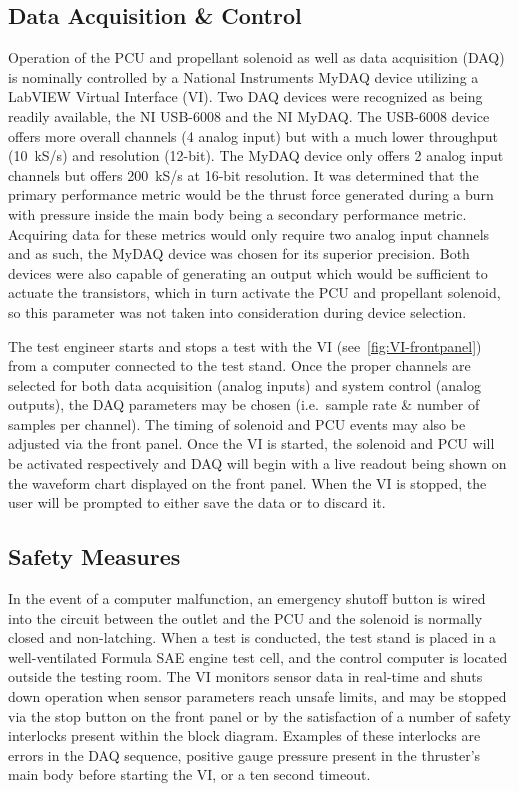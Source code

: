 \documentclass[journal]{IEEEtran}
\begin{document}
\subsection{Data Acquisition \& Control}

Operation of the PCU and propellant solenoid as well as data acquisition (DAQ) is nominally controlled by a National Instruments MyDAQ device utilizing a LabVIEW Virtual Interface (VI).
Two DAQ devices were recognized as being readily available, the NI USB-6008 and the NI MyDAQ.\@
The USB-6008 device offers more overall channels (4 analog input) but with a much lower throughput (\SI{10}{kS/s}) and resolution (12-bit).
The MyDAQ device only offers 2 analog input channels but offers \SI{200}{kS/s} at 16-bit resolution. It was determined that the primary performance metric would be the thrust force generated during a burn with pressure inside the main body being a secondary performance metric.
Acquiring data for these metrics would only require two analog input channels and as such, the MyDAQ device was chosen for its superior precision.
Both devices were also capable of generating an output which would be sufficient to actuate the transistors, which in turn activate the PCU and propellant solenoid, so this parameter was not taken into consideration during device selection.

The test engineer starts and stops a test with the VI (see~\autoref{fig:VI-frontpanel}) from a computer connected to the test stand.
Once the proper channels are selected for both data acquisition (analog inputs) and system control (analog outputs), the DAQ parameters may be chosen (i.e.\ sample rate \& number of samples per channel).
The timing of solenoid and PCU events may also be adjusted via the front panel.
Once the VI is started, the solenoid and PCU will be activated respectively and DAQ will begin with a live readout being shown on the waveform chart displayed on the front panel.
When the VI is stopped, the user will be prompted to either save the data or to discard it.

\subsection{Safety Measures}
In the event of a computer malfunction, an emergency shutoff button is wired into the circuit between the outlet and the PCU and the solenoid is normally closed and non-latching.
When a test is conducted, the test stand is placed in a well-ventilated Formula SAE engine test cell, and the control computer is located outside the testing room.
The VI monitors sensor data in real-time and shuts down operation when sensor parameters reach unsafe limits, and may be stopped via the stop button on the front panel or by the satisfaction of a number of safety interlocks present within the block diagram.
Examples of these interlocks are errors in the DAQ sequence, positive gauge pressure present in the thruster's main body before starting the VI, or a ten second timeout.
\end{document}
